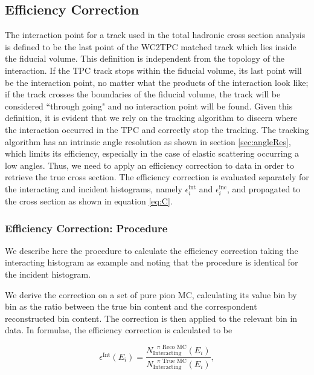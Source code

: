 \subsection{Efficiency Correction}\label{ch:EFFXS}
The interaction point for a track used in the total hadronic cross section analysis is defined to be the last point of the WC2TPC matched track which lies inside the fiducial volume. This definition is independent from the topology of the interaction. If the TPC track stops within the fiducial volume, its last point will be the interaction point, no matter what the products of the interaction look like; if the track crosses the boundaries of the fiducial volume, the track will be considered ``through going" and no interaction point will be found.  Given this definition, it is evident that we rely on the tracking algorithm to discern where the interaction occurred in the TPC  and correctly stop the tracking. The tracking algorithm has an intrinsic angle resolution as shown in section \ref{sec:angleRes}, which limits its efficiency, especially in the case of elastic scattering occurring a low angles. 
Thus, we need to apply an efficiency correction to data in order to retrieve the true cross section.  The efficiency correction is evaluated separately for the interacting and incident histograms, namely $\epsilon^{\text{int}}_i$ and  $\epsilon^{\text{inc}}_i$, and propagated to the cross section as shown in  equation \ref{eq:C}. 

\subsubsection{Efficiency Correction: Procedure}\label{sec:EffCorrection}
We describe here the procedure to calculate the efficiency correction taking the interacting histogram as example and noting that the procedure is identical for the  incident histogram. 

We derive the correction on a set of pure pion MC, calculating its value bin by bin as the ratio between the true bin content and the correspondent reconstructed bin content. The correction is then applied to the relevant bin in data. In formulae, the efficiency correction is calculated to be

\begin{equation}
 \epsilon^{\text{Int}}(E_i)  =  \frac{N^{\text{ $\pi$ Reco MC}}_{\text{Interacting}} (E_{i})}{ N^{\text{ $\pi$ True MC}}_{\text{Interacting}} (E_{i})  },
\end{equation}
 
